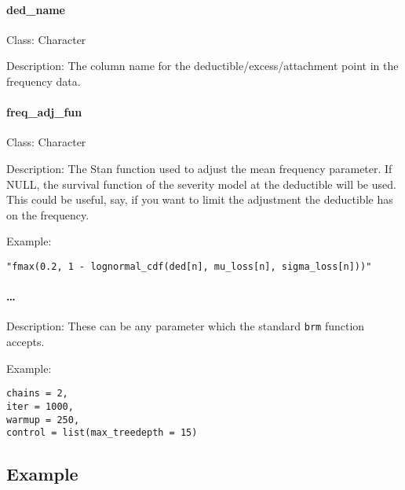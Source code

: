 \documentclass[
]{book}
\begin{document}
\hypertarget{ded_name}{%
\paragraph{ded\_name}\label{ded_name}}

Class: Character

Description: The column name for the deductible/excess/attachment point in the frequency data.

\hypertarget{freq_adj_fun}{%
\paragraph{freq\_adj\_fun}\label{freq_adj_fun}}

Class: Character

Description: The Stan function used to adjust the mean frequency parameter. If NULL, the survival function of the severity model at the deductible will be used. This could be useful, say, if you want to limit the adjustment the deductible has on the frequency.

Example:

\begin{verbatim}
"fmax(0.2, 1 - lognormal_cdf(ded[n], mu_loss[n], sigma_loss[n]))"
\end{verbatim}

\hypertarget{section}{%
\paragraph{\ldots{}}\label{section}}

Description: These can be any parameter which the standard \texttt{brm} function accepts.

Example:

\begin{verbatim}
chains = 2,
iter = 1000,
warmup = 250,
control = list(max_treedepth = 15)
\end{verbatim}

\hypertarget{example}{%
\subsection{Example}\label{example}}
\end{document}
